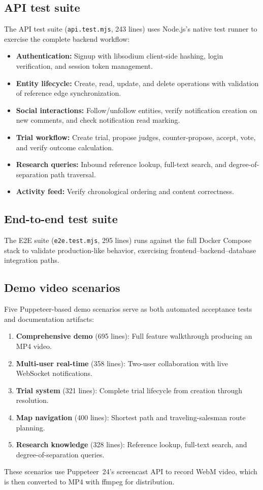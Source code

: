 \documentclass[13pt,a4paper]{report}
\begin{document}
\subsection{API test suite}
The API test suite (\texttt{api.test.mjs}, 243 lines) uses Node.js's native test runner to exercise the complete backend workflow:
\begin{itemize}
    \item \textbf{Authentication:} Signup with libsodium client-side hashing, login verification, and session token management.
    \item \textbf{Entity lifecycle:} Create, read, update, and delete operations with validation of reference edge synchronization.
    \item \textbf{Social interactions:} Follow/unfollow entities, verify notification creation on new comments, and check notification read marking.
    \item \textbf{Trial workflow:} Create trial, propose judges, counter-propose, accept, vote, and verify outcome calculation.
    \item \textbf{Research queries:} Inbound reference lookup, full-text search, and degree-of-separation path traversal.
    \item \textbf{Activity feed:} Verify chronological ordering and content correctness.
\end{itemize}

\subsection{End-to-end test suite}
The E2E suite (\texttt{e2e.test.mjs}, 295 lines) runs against the full Docker Compose stack to validate production-like behavior, exercising frontend--backend--database integration paths.

\subsection{Demo video scenarios}
Five Puppeteer-based demo scenarios serve as both automated acceptance tests and documentation artifacts:
\begin{enumerate}
    \item \textbf{Comprehensive demo} (695 lines): Full feature walkthrough producing an MP4 video.
    \item \textbf{Multi-user real-time} (358 lines): Two-user collaboration with live WebSocket notifications.
    \item \textbf{Trial system} (321 lines): Complete trial lifecycle from creation through resolution.
    \item \textbf{Map navigation} (400 lines): Shortest path and traveling-salesman route planning.
    \item \textbf{Research knowledge} (328 lines): Reference lookup, full-text search, and degree-of-separation queries.
\end{enumerate}
These scenarios use Puppeteer~24's screencast API to record WebM video, which is then converted to MP4 with ffmpeg for distribution.
\end{document}
